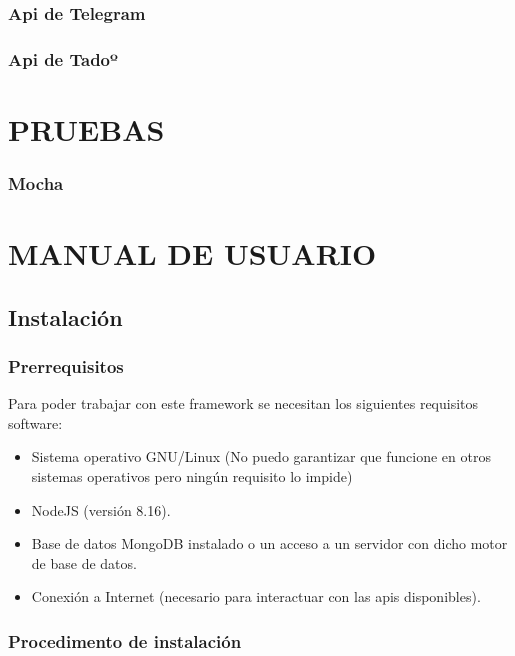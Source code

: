 \documentclass[spanish,12pt, a4paper, twoside]{paper}
\let\oldsection\section
\def\section{\cleardoublepage\oldsection}
\begin{document}
\subsubsection{Api de Telegram}

\subsubsection{Api de Tadoº}

\section{PRUEBAS}

\subsubsection{Mocha}

\section{MANUAL DE USUARIO}

\subsection{Instalación}

\subsubsection{Prerrequisitos}

Para poder trabajar con este framework se necesitan los siguientes requisitos software:

\begin{itemize}
\item Sistema operativo GNU/Linux (No puedo garantizar que funcione en otros sistemas operativos pero ningún requisito lo impide)
\item NodeJS (versión 8.16).
\item Base de datos MongoDB instalado o un acceso a un servidor con dicho motor de base de datos.
\item Conexión a Internet (necesario para interactuar con las apis disponibles).
\end{itemize}

\subsubsection{Procedimento de instalación}
\end{document}
